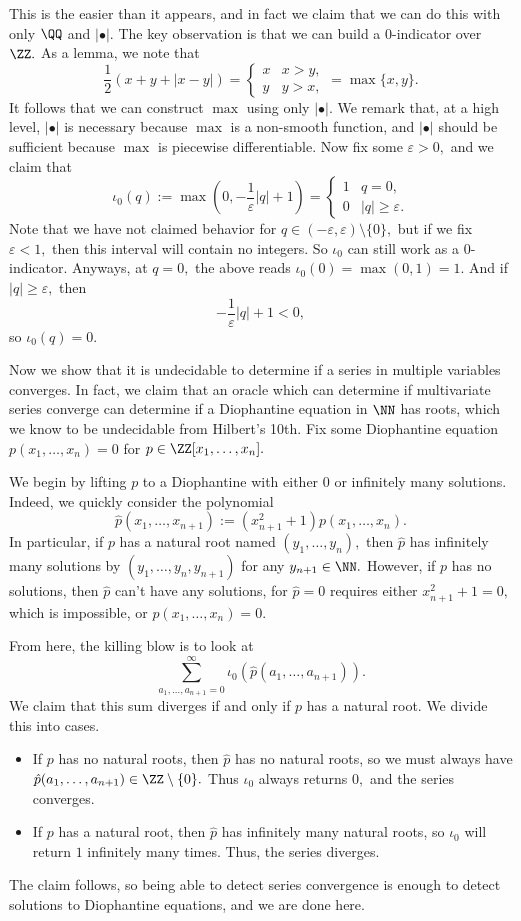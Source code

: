This is the easier than it appears, and in fact we claim that we can do this with only $\QQ$ and $|\bullet|.$ The key observation is that we can build a $0$-indicator over $\ZZ.$ As a lemma, we note that
\[\frac12(x+y+|x-y|)=\begin{cases}x & x>y, \\ y & y>x,\end{cases}=\max\{x,y\}.\]
It follows that we can construct $\max$ using only $|\bullet|.$ We remark that, at a high level, $|\bullet|$ is necessary because $\max$ is a non-smooth function, and $|\bullet|$ should be sufficient because $\max$ is piecewise differentiable. Now fix some $\varepsilon>0,$ and we claim that
\[\iota_0(q):=\max\left(0,-\frac1\varepsilon|q|+1\right)=\begin{cases}
    1 & q=0, \\
    0 & |q|\ge\varepsilon.
\end{cases}\]
Note that we have not claimed behavior for $q\in(-\varepsilon,\varepsilon)\setminus\{0\},$ but if we fix $\varepsilon<1,$ then this interval will contain no integers. So $\iota_0$ can still work as a $0$-indicator. Anyways, at $q=0,$ the above reads $\iota_0(0)=\max(0,1)=1.$ And if $|q|\ge\varepsilon,$ then
\[-\frac1\varepsilon|q|+1<0,\]
so $\iota_0(q)=0.$

Now we show that it is undecidable to determine if a series in multiple variables converges. In fact, we claim that an oracle which can determine if multivariate series converge can determine if a Diophantine equation in $\NN$ has roots, which we know to be undecidable from Hilbert's 10th. Fix some Diophantine equation $p(x_1,\ldots,x_n)=0$ for $p\in\ZZ[x_1,\ldots,x_n].$

We begin by lifting $p$ to a Diophantine with either $0$ or infinitely many solutions. Indeed, we quickly consider the polynomial
\[\hat p(x_1,\ldots,x_{n+1}):=\left(x_{n+1}^2+1\right)p(x_1,\ldots,x_n).\]
In particular, if $p$ has a natural root named $(y_1,\ldots,y_n),$ then $\hat p$ has infinitely many solutions by $(y_1,\ldots,y_n,y_{n+1})$ for any $y_{n+1}\in\NN.$ However, if $p$ has no solutions, then $\hat p$ can't have any solutions, for $\hat p=0$ requires either $x_{n+1}^2+1=0,$ which is impossible, or $p(x_1,\ldots,x_n)=0.$

From here, the killing blow is to look at
\[\sum_{a_1,\ldots,a_{n+1}=0}^\infty\iota_0\left(\hat p(a_1,\ldots,a_{n+1})\right).\]
We claim that this sum diverges if and only if $p$ has a natural root. We divide this into cases.
\begin{itemize}
    \item If $p$ has no natural roots, then $\hat p$ has no natural roots, so we must always have $\hat p(a_1,\ldots,a_{n+1})\in\ZZ\setminus\{0\}.$ Thus $\iota_0$ always returns $0,$ and the series converges.
    \item If $p$ has a natural root, then $\hat p$ has infinitely many natural roots, so $\iota_0$ will return $1$ infinitely many times. Thus, the series diverges.
\end{itemize}
The claim follows, so being able to detect series convergence is enough to detect solutions to Diophantine equations, and we are done here.

